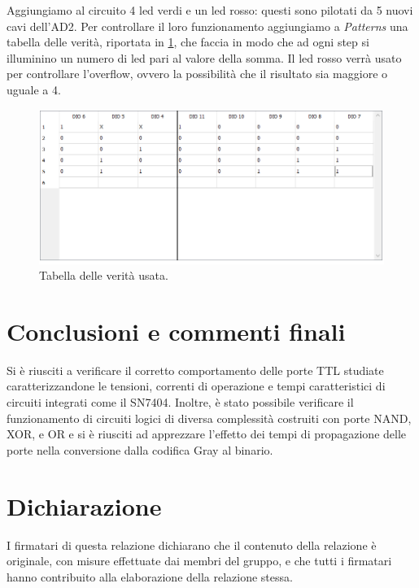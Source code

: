 \documentclass[10pt, a4paper, italian]{article}
\begin{document}
Aggiungiamo al circuito 4 led verdi e un led rosso: questi sono pilotati da 5 nuovi cavi dell'AD2. Per controllare il loro funzionamento aggiungiamo a \emph{Patterns} una tabella delle verità, riportata in \cref{fig: Ver}, che faccia in modo che ad ogni step si illuminino un numero di led pari al valore della somma. Il led rosso verrà usato per controllare l'overflow, ovvero la possibilità che il risultato sia maggiore o uguale a 4.

\begin{figure}[htbp]
    \centering
    \includegraphics[width=0.8\linewidth]{TAB_LED}
    \caption{Tabella delle verità usata.}
    \label{fig: Ver}
\end{figure}

\section*{Conclusioni e commenti finali}
Si è riusciti a verificare il corretto comportamento delle porte TTL studiate
caratterizzandone le tensioni, correnti di operazione e tempi caratteristici
di circuiti integrati come il SN7404.
Inoltre, è stato possibile verificare il funzionamento di circuiti logici di
diversa complessità costruiti con porte NAND, XOR, e OR e si è riusciti ad
apprezzare l'effetto dei tempi di propagazione delle porte nella conversione
dalla codifica Gray al binario.

\section*{Dichiarazione}
I firmatari di questa relazione dichiarano che il contenuto della relazione \`e
originale, con misure effettuate dai membri del gruppo, e che tutti i firmatari
hanno contribuito alla elaborazione della relazione stessa.
\end{document}
